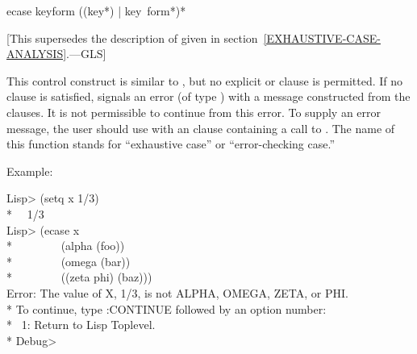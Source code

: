 \begin{defmac}
ecase keyform {({({key}*) | key} {\,form}*)}*

   [This supersedes the description of 
   given in section~\ref{EXHAUSTIVE-CASE-ANALYSIS}.---GLS]

  This control construct is similar to , but no explicit  or 
  clause is permitted. If no clause is satisfied,  signals an error
  (of type ) with a message constructed from the clauses. It is not
  permissible to continue from this error. To supply an error message, the
  user should use  with an  clause containing a call to .
  The name of this function stands for ``exhaustive case'' or ``error-checking
  case.''

Example:
\begin{lisp}
Lisp> (setq x 1/3) \\*
~\EV\ 1/3 \\
Lisp> (ecase x \\*
~~~~~~~~(alpha (foo)) \\*
~~~~~~~~(omega (bar)) \\*
~~~~~~~~((zeta phi) (baz))) \\
Error: The value of X, 1/3, is not ALPHA, OMEGA, ZETA, or PHI. \\*
To continue, type :CONTINUE followed by an option number: \\*
~1: Return to Lisp Toplevel. \\*
Debug>
\end{lisp}
\end{defmac}

